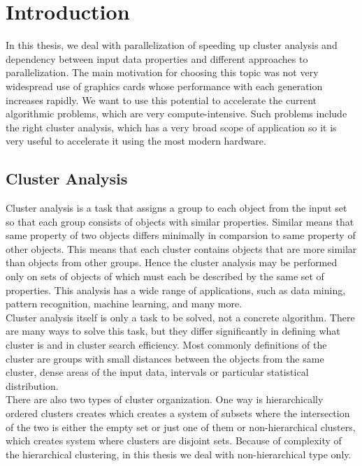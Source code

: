 \chapter{Introduction}

In this thesis, we deal with parallelization of speeding up cluster analysis and dependency between input data properties and different approaches to parallelization.
The main motivation for choosing this topic was not very widespread use of graphics cards whose performance with each generation increases rapidly. We want to use this potential to accelerate the current algorithmic problems, which are very compute-intensive. Such problems include the right cluster analysis, which has a very broad scope of application so it is very useful to accelerate it using the most modern hardware.

\section{Cluster Analysis} \label{sec:clusteranalysis}
Cluster analysis is a task that assigns a group to each object from the input set so that each group consists of objects with similar properties. Similar means that same property of two objects differs minimally in comparsion to same property of other objects. This means that each cluster contains objects that are more similar than objects from other groups. Hence the cluster analysis may be performed only on sets of objects of which must each be described by the same set of properties. This analysis has a wide range of applications, such as data mining, pattern recognition, machine learning, and many more.\\
Cluster analysis itself is only a task to be solved, not a concrete algorithm. There are many ways to solve this task, but they differ significantly in defining what cluster is and in cluster search efficiency. Most commonly definitions of the cluster are groups with small distances between the objects from the same cluster, dense areas of the input data, intervals or particular statistical distribution.\\
There are also two types of cluster organization. One way is hierarchically ordered clusters creates which creates a system of subsets where the intersection of the two is either the empty set or just one of them or non-hierarchical clusters, which creates system where clusters are disjoint sets. Because of complexity of the hierarchical clustering, in this thesis we deal with non-hierarchical type only.

